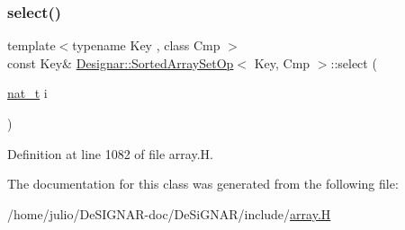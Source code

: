 \subsubsection{\texorpdfstring{select()}{select()}}
{\footnotesize\ttfamily template$<$typename Key , class Cmp $>$ \\
const Key\& \hyperlink{class_designar_1_1_sorted_array_set_op}{Designar\+::\+Sorted\+Array\+Set\+Op}$<$ Key, Cmp $>$\+::select (\begin{DoxyParamCaption}\item[{\hyperlink{namespace_designar_aa72662848b9f4815e7bf31a7cf3e33d1}{nat\+\_\+t}}]{i }\end{DoxyParamCaption})\hspace{0.3cm}{\ttfamily [inline]}}



Definition at line 1082 of file array.\+H.



The documentation for this class was generated from the following file\+:\begin{DoxyCompactItemize}
\item 
/home/julio/\+De\+S\+I\+G\+N\+A\+R-\/doc/\+De\+Si\+G\+N\+A\+R/include/\hyperlink{array_8_h}{array.\+H}\end{DoxyCompactItemize}
